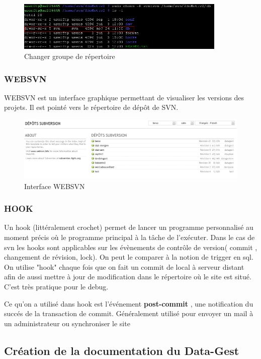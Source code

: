 \begin{figure}[hbtp]
\centering
\includegraphics[width=10cm]{body/images/svn-problem-permission.png}
\caption{Changer groupe de répertoire}
\end{figure}

\subsubsection{WEBSVN}
WEBSVN est un interface graphique permettant de visualiser les versions des projets. Il est pointé vers le répertoire de dépôt de SVN.
\begin{figure}[hbtp]
\centering
\includegraphics[width=15cm]{body/images/websvn.png}
\caption{Interface WEBSVN}
\end{figure}


\subsubsection{HOOK}
Un hook (littéralement crochet) permet de lancer un programme personnalisé au moment précis où le programme principal à la tâche de l’exécuter. Dans le cas de svn les hooks sont applicables sur les évènements de contrôle de version( commit , changement de révision, lock). On peut le comparer à la notion de trigger en sql.
On utilise "hook" chaque fois que on fait un commit de local à serveur distant afin de aussi mettre à jour de modification dans le répertoire où le site est situé. C'est très pratique pour le debug.

Ce qu'on a utilisé dans hook est l'événement \textbf{post-commit} , une notification du succés de la transaction de commit. Généralement utilisé pour envoyer un mail à un administrateur ou synchroniser le site 


\subsection{Création de la documentation du Data-Gest}
